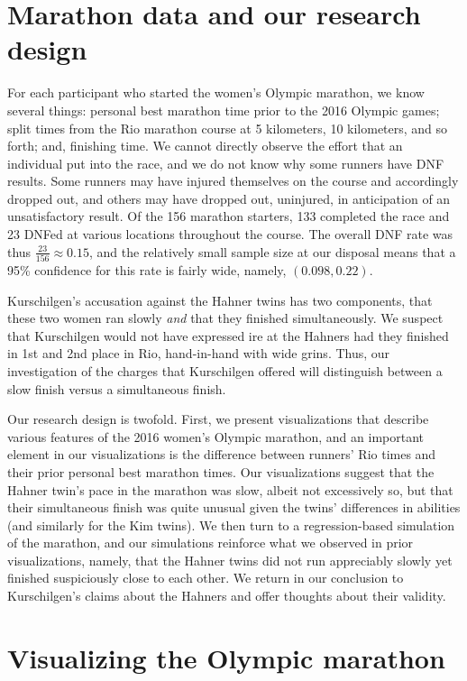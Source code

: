 \documentclass[12pt,titlepage]{article}
\begin{document}
\section*{Marathon data and our research design}

For each participant who started the women's Olympic marathon, we know
several things: personal best marathon time prior to the 2016 Olympic
games; split times from the Rio marathon course at 5 kilometers, 10
kilometers, and so forth; and, finishing time. We cannot directly
observe the effort that an individual put into the race, and we do not
know why some runners have DNF results.  Some runners may have injured
themselves on the course and accordingly dropped out, and others may
have dropped out, uninjured, in anticipation of an unsatisfactory
result. Of the 156 marathon starters, 133 completed the race and 23
DNFed at various locations throughout the course. The overall DNF rate
was thus $\frac{23}{156} \approx 0.15$, and the relatively small
sample size at our disposal means that a 95\% confidence for this rate
is fairly wide, namely, $\left(0.098, 0.22\right)$.

Kurschilgen's accusation against the Hahner twins has two components,
that these two women ran slowly \emph{and} that they finished
simultaneously.  We suspect that Kurschilgen would not have expressed
ire at the Hahners had they finished in 1st and 2nd place in Rio,
hand-in-hand with wide grins.  Thus, our investigation of the charges
that Kurschilgen offered will distinguish between a slow finish versus
a simultaneous finish.

Our research design is twofold.  First, we present visualizations that
describe various features of the 2016 women's Olympic marathon, and an
important element in our visualizations is the difference between
runners' Rio times and their prior personal best marathon times.  Our
visualizations suggest that the Hahner twin's pace in the marathon was
slow, albeit not excessively so, but that their simultaneous finish
was quite unusual given the twins' differences in abilities (and
similarly for the Kim twins).  We then turn to a regression-based
simulation of the marathon, and our simulations reinforce what we
observed in prior visualizations, namely, that the Hahner twins did
not run appreciably slowly yet finished suspiciously close to each
other.  We return in our conclusion to Kurschilgen's claims about the
Hahners and offer thoughts about their validity.

\section*{Visualizing the Olympic marathon}
\end{document}
